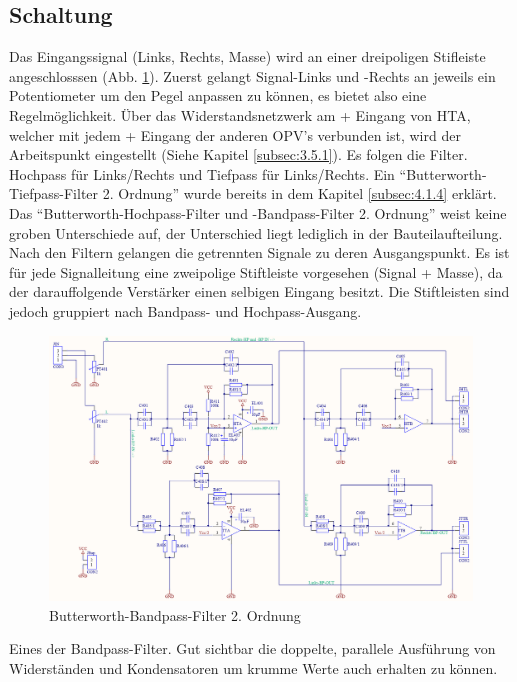 \subsection{Schaltung}\label{subsec:4.3.4}
Das Eingangssignal (Links, Rechts, Masse) wird an einer dreipoligen Stifleiste angeschlosssen (Abb. \ref{fig:4.3.4.1}).
Zuerst gelangt Signal-Links und -Rechts an jeweils ein Potentiometer um den Pegel anpassen zu können, es bietet also eine Regelmöglichkeit.
Über das Widerstandsnetzwerk am + Eingang von HTA, welcher mit jedem + Eingang der anderen OPV's verbunden ist, wird der Arbeitspunkt eingestellt (Siehe Kapitel \ref{subsec:3.5.1}).
Es folgen die Filter.
Hochpass für Links/Rechts und Tiefpass für Links/Rechts.
Ein \enquote{Butterworth-Tiefpass-Filter 2. Ordnung} wurde bereits in dem Kapitel \ref{subsec:4.1.4} erklärt.
Das \enquote{Butterworth-Hochpass-Filter und -Bandpass-Filter 2. Ordnung} weist keine groben Unterschiede auf, der Unterschied liegt lediglich in der Bauteilaufteilung.\\
Nach den Filtern gelangen die getrennten Signale zu deren Ausgangspunkt. Es ist für jede Signalleitung eine zweipolige Stiftleiste vorgesehen (Signal + Masse), da der darauffolgende Verstärker einen selbigen Eingang besitzt.
Die Stiftleisten sind jedoch gruppiert nach Bandpass- und Hochpass-Ausgang.\\
\begin{figure} [H]
	\centering	
	\includegraphics[width=1\textwidth]{img/Print4/4_TTuHTWeiche-Schematic.PNG}
	\caption{Butterworth-Bandpass-Filter 2. Ordnung}
	\label {fig:4.3.4.1}
\end{figure}
Eines der Bandpass-Filter.
Gut sichtbar die doppelte, parallele Ausführung von Widerständen und Kondensatoren um krumme Werte auch erhalten zu können.
